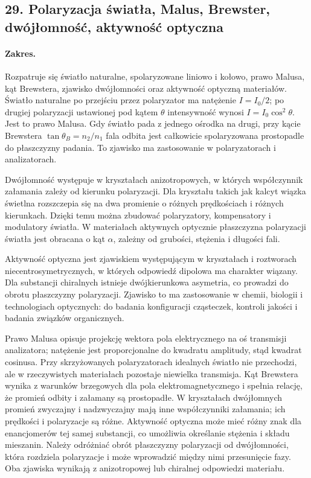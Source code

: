 \documentclass[11pt,a4paper]{article}
\begin{document}
\subsection{29. Polaryzacja światła, Malus, Brewster, dwójłomność, aktywność optyczna}
\paragraph{Zakres.} Rozpatruje się światło naturalne, spolaryzowane liniowo i kołowo, prawo Malusa, kąt Brewstera, zjawisko dwójłomności oraz aktywność optyczną materiałów. Światło naturalne po przejściu przez polaryzator ma natężenie $I=I_0/2$; po drugiej polaryzacji ustawionej pod kątem $\theta$ intensywność wynosi $I=I_0\cos^2\theta$. Jest to prawo Malusa. Gdy światło pada z jednego ośrodka na drugi, przy kącie Brewstera $\tan\theta_B=n_2/n_1$ fala odbita jest całkowicie spolaryzowana prostopadle do płaszczyzny padania. To zjawisko ma zastosowanie w polaryzatorach i analizatorach.\par
Dwójłomność występuje w kryształach anizotropowych, w których współczynnik załamania zależy od kierunku polaryzacji. Dla kryształu takich jak kalcyt wiązka świetlna rozszczepia się na dwa promienie o różnych prędkościach i różnych kierunkach. Dzięki temu można zbudować polaryzatory, kompensatory i modulatory światła. W materiałach aktywnych optycznie płaszczyzna polaryzacji światła jest obracana o kąt $\alpha$, zależny od grubości, stężenia i długości fali.\par
Aktywność optyczna jest zjawiskiem występującym w kryształach i roztworach niecentrosymetrycznych, w których odpowiedź dipolowa ma charakter wiązany. Dla substancji chiralnych istnieje dwójkierunkowa asymetria, co prowadzi do obrotu płaszczyzny polaryzacji. Zjawisko to ma zastosowanie w chemii, biologii i technologiach optycznych: do badania konfiguracji cząsteczek, kontroli jakości i badania związków organicznych.\par

Prawo Malusa opisuje projekcję wektora pola elektrycznego na oś transmisji analizatora; natężenie jest proporcjonalne do kwadratu amplitudy, stąd kwadrat cosinusa. Przy skrzyżowanych polaryzatorach idealnych światło nie przechodzi, ale w rzeczywistych materiałach pozostaje niewielka transmisja. Kąt Brewstera wynika z warunków brzegowych dla pola elektromagnetycznego i spełnia relację, że promień odbity i załamany są prostopadłe. W kryształach dwójłomnych promień zwyczajny i nadzwyczajny mają inne współczynniki załamania; ich prędkości i polaryzacje są różne. Aktywność optyczna może mieć różny znak dla enancjomerów tej samej substancji, co umożliwia określanie stężenia i składu mieszanin. Należy odróżniać obrót płaszczyzny polaryzacji od dwójłomności, która rozdziela polaryzacje i może wprowadzić między nimi przesunięcie fazy. Oba zjawiska wynikają z anizotropowej lub chiralnej odpowiedzi materiału.
\par
\end{document}
